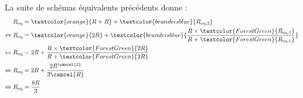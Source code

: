 \documentclass[../main/main.tex]{subfiles}
\begin{document}
La suite de schémas équivalents précédents donne :
\begin{align*}
    R_{\rm eq}                 & = \textcolor{orange}{R + R} +
        \textcolor{brandeisblue}{R_{\rm eq,2}} \\
    \Leftrightarrow R_{\rm eq} & = \textcolor{orange}{2R} +
        \textcolor{brandeisblue}{\frac{
                R\times \textcolor{ForestGreen}{R_{\rm eq,1}}
        }{R + \textcolor{ForestGreen}{R_{\rm eq,1}}}}\\
    \Leftrightarrow R_{\rm eq} & = 2R + \frac{
        R\times\textcolor{ForestGreen}{2R}}{
        R+\textcolor{ForestGreen}{2R}} \\
    \Leftrightarrow R_{\rm eq} & = 2R + \frac{2R^{\cancel{2}}}{3\cancel{R}}\\
    \Leftrightarrow R_{\rm eq} & = \frac{8R}{3}
\end{align*}
\end{document}
